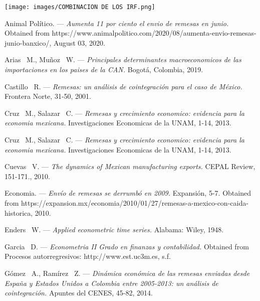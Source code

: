 \documentclass[12pt,english, spanish]{smfart}
\begin{document}
   \texttt{[image: images/COMBINACION DE LOS IRF.png]}

\def\refname{L\MakeLowercase{iterature and sources}}
\begin{thebibliography}{99}
  {\sc Animal Político.} ---
  {\it Aumenta 11 por ciento el envio de remesas en junio.}
  Obtained from https://www.animalpolitico.com/2020/08/aumenta-envio-remesas-junio-banxico/, August 03, 2020.

  {\sc Arias \ M., Muñoz \ W.} ---
  {\it Principales determinantes macroeconomicos de las importaciones en los paises de la CAN.}
  Bogotá, Colombia, 2019.

  {\sc Castillo \ R.} ---
  {\it Remesas: un análisis de cointegración para el caso de México.}
  Frontera Norte, 31-50, 2001.
  
  {\sc Cruz \ M., Salazar \ C.} ---
  {\it Remesas y crecimiento economico: evidencia para la economia mexicana.}
  Investigaciones Economicas de la UNAM, 1-14, 2013.
  
  {\sc Cruz \ M., Salazar \ C.} ---
  {\it Remesas y crecimiento economico: evidencia para la economia mexicana.}
  Investigaciones Economicas de la UNAM, 1-14, 2013.
  
  {\sc Cuevas \ V.} ---
  {\it The dynamics of Mexican manufacturing exports.}
  CEPAL Review, 151-171., 2010.
  
  {\sc Economia.} ---
  {\it Envío de remesas se derrumbó en 2009.}
  Expansión, 5-7. Obtained from https://expansion.mx/economia/2010/01/27/remesas-a-mexico-con-caida-historica, 2010.
  
  {\sc Enders \ W.} ---
  {\it Applied econometric time series.}
  Alabama: Wiley, 1948.
  
  {\sc Garcia \ D.} ---
  {\it Econometria II Grado en finanzas y contabilidad.}
 Obtained from Procesos autorregresivos: http://www.est.uc3m.es, s.f.
 
  {\sc Gómez \ A., Ramírez \ Z.} ---
  {\it Dinámica económica de las remesas enviadas desde España y Estados Unidos a Colombia entre 2005-2013: un análisis de cointegración.}
  Apuntes del CENES, 45-82, 2014.
  

\end{thebibliography}
\end{document}
